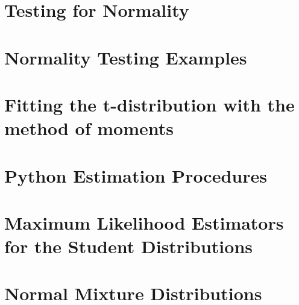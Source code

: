 \documentclass[11pt]{article}
\begin{document}
    \section{Testing for Normality}
    \section{Normality Testing Examples}
    \section{Fitting the t-distribution with the method of moments}
    \section{Python Estimation Procedures}
    \section{Maximum Likelihood Estimators for the Student Distributions}
    \section{Normal Mixture Distributions}
    
\end{document}
